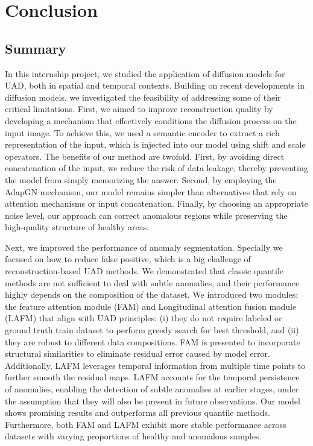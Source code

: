 \chapter{Conclusion}
\label{chapter:conclusion}

\section{Summary}

In this internship project, we studied the application of diffusion models for \ac{UAD}, both in spatial and temporal contexts. Building on recent developments in diffusion models, we investigated the feasibility of addressing some of their critical limitations. First, we aimed to improve reconstruction quality by developing a mechanism that effectively conditions the diffusion process on the input image. To achieve this, we used a semantic encoder to extract a rich representation of the input, which is injected into our model using shift and scale operators. The benefits of our method are twofold. First, by avoiding direct concatenation of the input, we reduce the risk of data leakage, thereby preventing the model from simply memorizing the answer. Second, by employing the AdapGN mechanism, our model remains simpler than alternatives that rely on attention mechanisms or input concatenation. Finally, by choosing an appropriate noise level, our approach can correct anomalous regions while preserving the high-quality structure of healthy areas.

Next, we improved the performance of anomaly segmentation. Specially we focused on how to reduce false positive, which is a big challenge of reconstruction-based UAD methods. We demonstrated that classic quantile methods are not sufficient to deal with subtle anomalies, and their performance highly depends on the composition of the dataset. We introduced two modules: the feature attention module (FAM) and Longitudinal attention fusion module (LAFM) that align with \ac{UAD} principles: (i) they do not require labeled or ground truth train dataset to perform greedy search for best threshold, and (ii) they are robust to different data compositions. FAM is presented to incorporate structural similarities to eliminate residual error caused by model error. Additionally, LAFM leverages temporal information from multiple time points to further smooth the residual maps. LAFM accounts for the temporal persistence of anomalies, enabling the detection of subtle anomalies at earlier stages, under the assumption that they will also be present in future observations. Our model shows promising results and outperforms all previous quantile methods. Furthermore, both FAM and LAFM exhibit more stable performance across datasets with varying proportions of healthy and anomalous samples.

